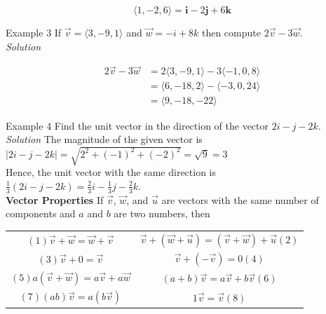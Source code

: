 \documentclass{article}
\begin{document}
            \begin{equation*}
                \langle 1,-2,6 \rangle= \textbf{i} - 2\textbf{j} + 6\textbf{k}
            \end{equation*}

            \noindent \color{blue} Example 3 \color{black} If $\overrightarrow{v}=\langle3,-9,1\rangle$
            and $\overrightarrow{w}=-i+8k$ then compute $2\overrightarrow{v}-3\overrightarrow{w}.$\\

            \emph{Solution}

            \begin{align*}
                2\overrightarrow{v}-3\overrightarrow{w} &= 2\langle3,-9,1\rangle-3\langle-1,0,8\rangle\\
                &= \langle6,-18,2\rangle-\langle-3,0,24\rangle\\
                &= \langle9,-18,-22\rangle
            \end{align*}

            \noindent \color{blue} Example 4 \color{black} Find the unit vector in the direction of
            the vector $2i-j-2k$.\\

            \noindent \emph{Solution} The magnitude of the given vector is\\
            $|2i-j-2k|=\sqrt{2^2+(-1)^2+(-2)^2}=\sqrt{9}=3$\\
            Hence, the unit vector with the same direction is\\
            $\frac{1}{3}(2i-j-2k)=\frac{2}{3}i-\frac{1}{3}j-\frac{2}{3}k$.\\

            \noindent \color{purple} \textbf{Vector Properties} \color{black} If
            $\overrightarrow{v}$, $\overrightarrow{w}$, and $\overrightarrow{u}$ are vectors with the
            same number of components and $a$ and $b$ are two numbers, then

            \begin{center}
                \begin{tabular}{c|c}
                    $(1)\overrightarrow{v}+\overrightarrow{w}=\overrightarrow{w}+\overrightarrow{v}$
                    & $\overrightarrow{v}+(\overrightarrow{w}+\overrightarrow{u})=(\overrightarrow{v}
                    +\overrightarrow{w})+\overrightarrow{u}(2)$ \\
                    $(3)\overrightarrow{v}+0=\overrightarrow{v}$
                    & $\overrightarrow{v}+(-\overrightarrow{v})=0(4)$\\
                    $(5)a(\overrightarrow{v}+\overrightarrow{w})=a\overrightarrow{v}+a\overrightarrow{w}$
                    & $(a+b)\overrightarrow{v}=a\overrightarrow{v}+b\overrightarrow{v}(6)$\\
                    $(7)(ab)\overrightarrow{v}=a(b\overrightarrow{v})$
                    & $1\overrightarrow{v} = \overrightarrow{v}(8)$
                \end{tabular}
            \end{center}
\end{document}
